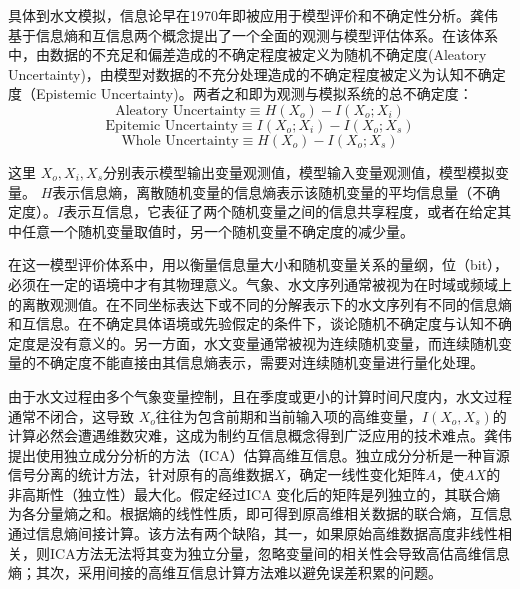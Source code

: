具体到水文模拟，信息论早在1970年即被应用于模型评价和不确定性分析\cite{amorocho1973entropy,chapman1986entropy,abebe2003managing,pokhrel2010use,weijs2010hydrological,weijs2011accounting}。龚伟 基于信息熵和互信息两个概念提出了一个全面的观测与模型评估体系\cite{gong2013estimating}。在该体系中，由数据的不充足和偏差造成的不确定程度被定义为随机不确定度(Aleatory Uncertainty)，由模型对数据的不充分处理造成的不确定程度被定义为认知不确定度（Epistemic Uncertainty)。两者之和即为观测与模拟系统的总不确定度：
\begin{equation}
\text{Aleatory Uncertainty}\equiv H(X_{o})-I(X_{o};X_{i})
\end{equation}
\begin{equation}
\text{Epitemic Uncertainty}\equiv I(X_{o};X_{i})-I(X_{o};X_{s})
\end{equation}
\begin{equation}
\text{Whole Uncertainty}\equiv H(X_{o})-I(X_{o};X_{s})
\end{equation}

这里 $X_o,X_i,X_s$分别表示模型输出变量观测值，模型输入变量观测值，模型模拟变量。
$H$表示信息熵，离散随机变量的信息熵表示该随机变量的平均信息量（不确定度）。$I$表示互信息，它表征了两个随机变量之间的信息共享程度，或者在给定其中任意一个随机变量取值时，另一个随机变量不确定度的减少量。

在这一模型评价体系中，用以衡量信息量大小和随机变量关系的量纲，位（bit），必须在一定的语境中才有其物理意义。气象、水文序列通常被视为在时域或频域上的离散观测值。在不同坐标表达下或不同的分解表示下的水文序列有不同的信息熵和互信息。在不确定具体语境或先验假定的条件下，谈论随机不确定度与认知不确定度是没有意义的\cite{weijs2013data}。另一方面，水文变量通常被视为连续随机变量，而连续随机变量的不确定度不能直接由其信息熵表示，需要对连续随机变量进行量化处理。

由于水文过程由多个气象变量控制，且在季度或更小的计算时间尺度内，水文过程通常不闭合，这导致
$X_o$往往为包含前期和当前输入项的高维变量，$I(X_o,X_s)$的计算必然会遭遇维数灾难\cite{bellman1962applied}，这成为制约互信息概念得到广泛应用的技术难点。龚伟提出使用独立成分分析的方法（ICA）\cite{gong2013estimating}估算高维互信息。独立成分分析是一种盲源信号分离的统计方法，针对原有的高维数据$X$，确定一线性变化矩阵$A$，使$AX$的非高斯性（独立性）最大化。假定经过ICA	变化后的矩阵是列独立的，其联合熵为各分量熵之和。根据熵的线性性质，即可得到原高维相关数据的联合熵，互信息通过信息熵间接计算。该方法有两个缺陷，其一，如果原始高维数据高度非线性相关，则ICA方法无法将其变为独立分量，忽略变量间的相关性会导致高估高维信息熵；其次，采用间接的高维互信息计算方法难以避免误差积累的问题。

